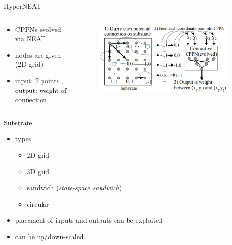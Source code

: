 \documentclass{beamer}
\begin{document}
\begin{frame}{HyperNEAT}
    \begin{columns}
        \begin{column}{0.5\textwidth}
            \begin{itemize}
                \item CPPNs evolved via NEAT
                \item nodes are given (2D grid)
                \item input: 2 points , output: weight of connection
            \end{itemize}
        \end{column}
        \begin{column}{0.5\textwidth}
            \begin{figure}[c]
                \includegraphics[width=\textwidth]{img/HyperNEAT.png}
            \end{figure}
        \end{column}
    \end{columns}
\end{frame}
\begin{frame}{Substrate}
    \begin{itemize}
        \item types
              \begin{itemize}
                  \item 2D grid
                  \item 3D grid
                  \item sandwich (\emph{state-space sandwich})
                  \item circular
              \end{itemize}
        \item placement of inputs and outputs can be exploited
        \item can be up/down-scaled
    \end{itemize}
\end{frame}
\end{document}
